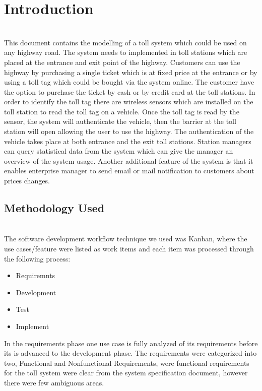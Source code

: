 \chapter{Introduction}
\trevon \\
\noindent
This document contains the modelling of a toll system which could be used on any highway road. The system needs to implemented in toll stations which are placed at the entrance and exit point of the highway. Customers can use the highway by purchasing a single ticket which is at fixed price at the entrance or by using a toll tag which could be bought via the system online. The customer have the option to purchase the ticket by cash or by credit card at the toll stations. In order to identify the toll tag there are wireless sensors which are installed on the toll station to read the toll tag on a vehicle. Once the toll tag is read by the sensor, the system will authenticate the vehicle, then the barrier at the toll station will open allowing the user to use the highway. The authentication of the vehicle takes place at both entrance and the exit toll stations. Station managers can query statistical data from the system which can give the manager an overview of the system usage. Another additional feature of the system is that it enables enterprise manager to send email or mail notification to customers about prices changes.
\section{Methodology Used}
\trevon \\
The software development workflow technique we used was Kanban, where the use cases/feature were listed as work items and each item was processed through the following process:

\begin{itemize}
  \item Requiremnts 
  \item Development
  \item Test
  \item Implement
\end{itemize}


In the requirements phase one use case is fully analyzed of its requirements before its is advanced to the development phase. The requirements were categorized into two, Functional and Nonfunctional Requirements, were functional requirements for the toll system were clear from the system specification document, however there were few ambiguous areas. 

